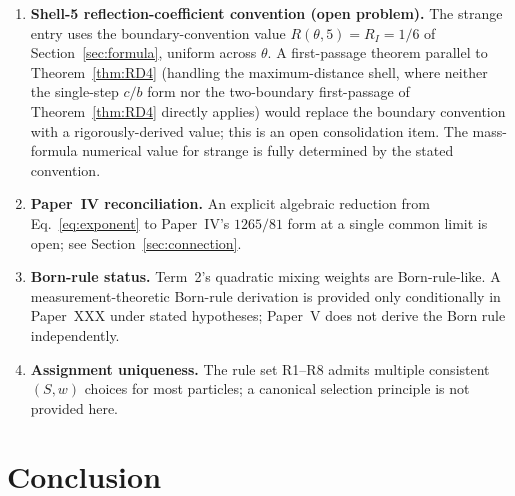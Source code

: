 \documentclass[12pt]{article}
\begin{document}
\begin{enumerate}
    \item \textbf{Shell-5 reflection-coefficient convention (open problem).} The strange entry uses the boundary-convention value $R(\theta, 5) = R_I = 1/6$ of Section~\ref{sec:formula}, uniform across $\theta$. A first-passage theorem parallel to Theorem~\ref{thm:RD4} (handling the maximum-distance shell, where neither the single-step $c/b$ form nor the two-boundary first-passage of Theorem~\ref{thm:RD4} directly applies) would replace the boundary convention with a rigorously-derived value; this is an open consolidation item. The mass-formula numerical value for strange is fully determined by the stated convention.
    \item \textbf{Paper~IV reconciliation.} An explicit algebraic reduction from Eq.~\eqref{eq:exponent} to Paper~IV's $1265/81$ form at a single common limit is open; see Section~\ref{sec:connection}.
    \item \textbf{Born-rule status.} Term~2's quadratic mixing weights are Born-rule-like. A measurement-theoretic Born-rule derivation is provided only conditionally in Paper~XXX under stated hypotheses; Paper~V does not derive the Born rule independently.
    \item \textbf{Assignment uniqueness.} The rule set R1--R8 admits multiple consistent $(S,w)$ choices for most particles; a canonical selection principle is not provided here.
\end{enumerate}

\section{Conclusion}\label{sec:conclusion}
\end{document}
